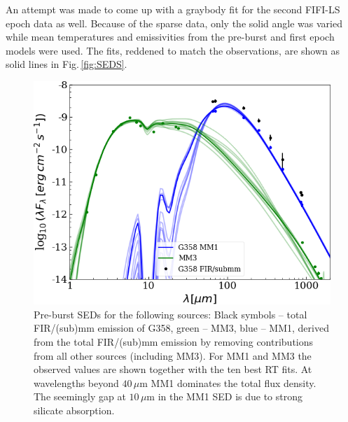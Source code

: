 An attempt was made to come up with a graybody fit for the second FIFI-LS epoch data as well. Because of the sparse data, only the solid angle was varied while mean temperatures and emissivities from the pre-burst and first epoch models were used. The fits, reddened to match the observations, are shown as solid lines in Fig.\,\ref{fig:SEDS}.


\begin{figure}
    \sidecaption
	\includegraphics[width=12cm]{G358_ap3_pre.png}
	\caption{Pre-burst SEDs for the following
	sources: Black symbols -- total FIR/(sub)mm emission of G358, green -- 
	MM3, blue -- 
	MM1, derived from the total FIR/(sub)mm emission by removing contributions from all other sources (including MM3).
	For MM1 and MM3 the observed values are shown together with the ten best RT fits. 
	At wavelengths beyond $40\,\mu$m MM1 dominates the total flux density. The seemingly gap at $10\,\mu$m in the MM1 SED is due to strong silicate absorption.} 
 \label{fig:sed g358 pre}
\end{figure}


